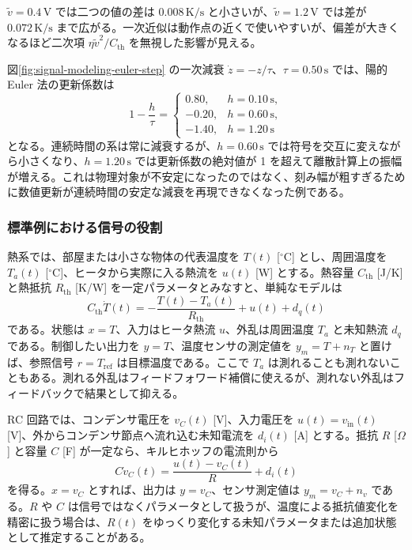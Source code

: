 $\tilde{v}=0.4\,\mathrm{V}$ では二つの値の差は $0.008\,\mathrm{K/s}$ と小さいが、$\tilde{v}=1.2\,\mathrm{V}$ では差が $0.072\,\mathrm{K/s}$ まで広がる。一次近似は動作点の近くで使いやすいが、偏差が大きくなるほど二次項 $\eta\tilde{v}^2/C_{\mathrm{th}}$ を無視した影響が見える。

図\ref{fig:signal-modeling-euler-step} の一次減衰 $\dot{z}=-z/\tau$、$\tau=0.50\,\mathrm{s}$ では、陽的 Euler 法の更新係数は
\begin{equation}
  1-\frac{h}{\tau}
  =
  \begin{cases}
  0.80, & h=0.10\,\mathrm{s},\\
  -0.20, & h=0.60\,\mathrm{s},\\
  -1.40, & h=1.20\,\mathrm{s}
  \end{cases}
\end{equation}
となる。連続時間の系は常に減衰するが、$h=0.60\,\mathrm{s}$ では符号を交互に変えながら小さくなり、$h=1.20\,\mathrm{s}$ では更新係数の絶対値が 1 を超えて離散計算上の振幅が増える。これは物理対象が不安定になったのではなく、刻み幅が粗すぎるために数値更新が連続時間の安定な減衰を再現できなくなった例である。

\subsubsection{標準例における信号の役割}

熱系では、部屋または小さな物体の代表温度を $T(t)$ [$^\circ\mathrm{C}$] とし、周囲温度を $T_a(t)$ [$^\circ\mathrm{C}$]、ヒータから実際に入る熱流を $u(t)$ [W] とする。熱容量 $C_{\mathrm{th}}$ [J/K] と熱抵抗 $R_{\mathrm{th}}$ [K/W] を一定パラメータとみなすと、単純なモデルは
\begin{equation}
  C_{\mathrm{th}}\dot{T}(t)
  =-\frac{T(t)-T_a(t)}{R_{\mathrm{th}}}+u(t)+d_q(t)
  \label{eq:thermal-signal-example}
\end{equation}
である。状態は $x=T$、入力はヒータ熱流 $u$、外乱は周囲温度 $T_a$ と未知熱流 $d_q$ である。制御したい出力を $y=T$、温度センサの測定値を $y_m=T+n_T$ と置けば、参照信号 $r=T_{\mathrm{ref}}$ は目標温度である。ここで $T_a$ は測れることも測れないこともある。測れる外乱はフィードフォワード補償に使えるが、測れない外乱はフィードバックで結果として抑える。

RC 回路では、コンデンサ電圧を $v_C(t)$ [V]、入力電圧を $u(t)=v_{\mathrm{in}}(t)$ [V]、外からコンデンサ節点へ流れ込む未知電流を $d_i(t)$ [A] とする。抵抗 $R$ [$\Omega$] と容量 $C$ [F] が一定なら、キルヒホッフの電流則から
\begin{equation}
  C\dot{v}_C(t)=\frac{u(t)-v_C(t)}{R}+d_i(t)
  \label{eq:rc-signal-example}
\end{equation}
を得る。$x=v_C$ とすれば、出力は $y=v_C$、センサ測定値は $y_m=v_C+n_v$ である。$R$ や $C$ は信号ではなくパラメータとして扱うが、温度による抵抗値変化を精密に扱う場合は、$R(t)$ をゆっくり変化する未知パラメータまたは追加状態として推定することがある。

